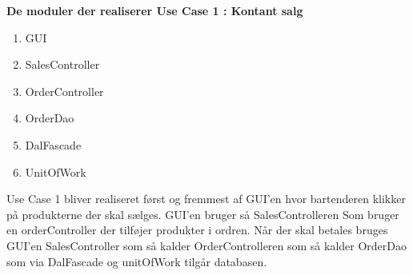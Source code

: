 \textbf{De moduler der realiserer Use Case 1 : Kontant salg}

\begin{enumerate}
	\item GUI
	\item SalesController
	\item OrderController
	\item OrderDao
	\item DalFascade
	\item UnitOfWork
\end{enumerate}

Use Case 1 bliver realiseret først og fremmest af GUI'en hvor bartenderen klikker på produkterne der skal sælges. GUI'en bruger så SalesControlleren Som bruger en orderController der tilføjer produkter i ordren. Når der skal betales bruges GUI'en SalesController som så kalder OrderControlleren som så kalder OrderDao som via DalFascade og unitOfWork tilgår databasen.